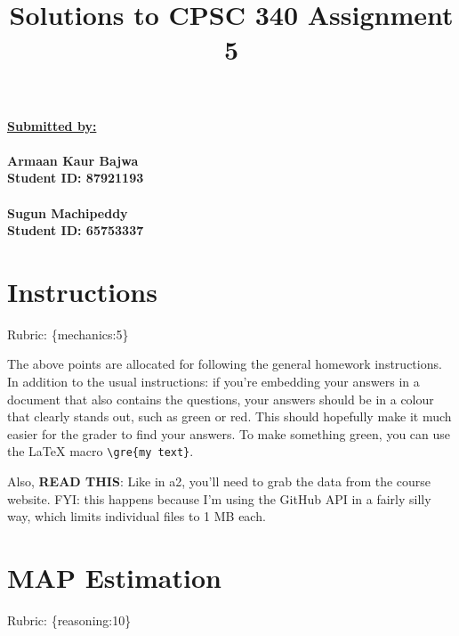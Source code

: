 \documentclass{article}
\def\rubric#1{\gre{Rubric: \{#1\}}}{}
\def\gre#1{{\color{gre}#1}}
\def\red#1{{\color{red}#1}}
\begin{document}
\title{Solutions to CPSC 340 Assignment 5}
\date{}
\maketitle

\underline{\textbf{Submitted by:}}\\ \\
 \textbf{Armaan Kaur Bajwa\\
 Student ID: 87921193\\ \\
 Sugun Machipeddy\\
 Student ID: 65753337} 

\vspace{1em}

\section*{Instructions}
\rubric{mechanics:5}

The above points are allocated for following the general homework instructions. In addition to the usual instructions:
if you're embedding your answers in a document that also contains the questions,
your answers should be in a colour that clearly stands out, such as
\gre{green} or \red{red}. This should hopefully make it much easier for the grader to find
your answers. To make something green, you can use the LaTeX macro \verb|\gre{my text}|.

Also, \textbf{\red{READ THIS}}: Like in a2, you'll need to grab the data from the course website. FYI: this happens because I'm using the GitHub API in a fairly silly way, which limits individual files to 1 MB each. 

\vspace{1em}


\section{MAP Estimation}
\rubric{reasoning:10}
\end{document}

